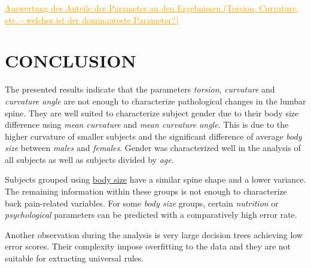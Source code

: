 \documentclass[a4paper,twoside]{style/article}
\newcommand{\com}[1]{\textcolor{orange}{\uline{#1}}}
\begin{document}


\com{Auswertung der Anteile der Parameter an den Ergebnissen (Torsion, Curvature, etc. - welches ist der dominanteste Parameter?)}

\section{\uppercase{Conclusion}}
\label{sec:Conclusion}
\noindent The presented results indicate that the parameters \emph{torsion}, \emph{curvature} and \emph{curvature angle} are not enough to characterize pathological changes in the lumbar spine.
They are well suited to characterize subject gender due to their body size difference using \emph{mean curvature} and \emph{mean curvature angle}.
This is due to the higher curvature of smaller subjects and the significant difference of average \emph{body size} between \emph{males} and \emph{females}.
Gender was characterized well in the analysis of all subjects as well as subjects divided by \emph{age}.

Subjects grouped using \underline{body size} have a similar spine shape and a lower variance.
The remaining information within these groups is not enough to characterize back pain-related variables.
For some \emph{body size} groups, certain \emph{nutrition} or \emph{psychological} parameters can be predicted with a comparatively high error rate.

Another observation during the analysis is very large decision trees achieving low error scores.
Their complexity impose overfitting to the data and they are not suitable for extracting universal rules.
\end{document}
